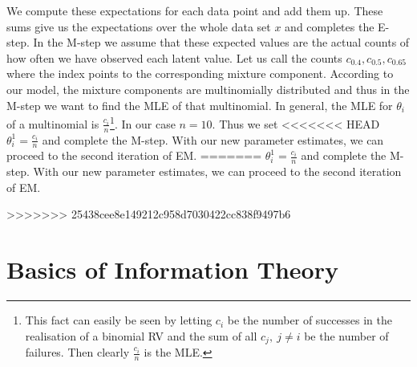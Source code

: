 We compute these expectations for each data point and add them up. These sums give us the expectations over the whole data set $ x $ and completes the E-step.
In the M-step we assume that these expected values are the actual counts of how often we have observed each latent value. Let us call the counts 
$ c_{0.4}, c_{0.5}, c_{0.65} $ where the index points to the corresponding mixture component. According to our model, the mixture components are multinomially
distributed and thus in the M-step we want to find the MLE of that multinomial. In general, the MLE for $ \theta_{i} $ of a multinomial is
$ \frac{c_{i}}{n} $\footnote{This fact can easily be seen by letting $ c_{i} $ be the number of successes in the realisation of a binomial RV and the sum of all
$ c_{j},~j \not = i $ be the number of failures. Then clearly $ \frac{c_{i}}{n} $ is the MLE.}. In our case $ n=10 $. Thus we set 
<<<<<<< HEAD
$ \theta_{i}^{1} = \frac{c_{i}}{n} $ and complete the M-step. With our new parameter estimates, we can proceed to the second iteration of EM.
=======
$ \theta_{i}^{1} = \frac{c_{i}}{n} $ and complete the M-step. With our new parameter estimates, we can proceed to the second iteration of EM. \bigskip

%

>>>>>>> 25438cee8e149212c958d7030422cc838f9497b6

\section{Basics of Information Theory}

